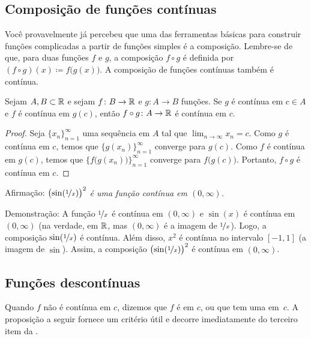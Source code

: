 \subsection{Composição de funções contínuas}

Você provavelmente já percebeu que uma das ferramentas básicas para
construir funções complicadas a partir de funções simples é a composição.
Lembre-se de que, para duas funções $f$ e $g$,
a composição $f \circ g$ é definida por
$(f \circ g)(x) \coloneqq f\bigl(g(x)\bigr)$.
A composição de
funções contínuas também é
contínua.

\begin{prop} \label{prop:compositioncont}
Sejam $A, B \subset {\mathbb{R}}$ e sejam $f \colon B \to {\mathbb{R}}$ e $g \colon A \to B$
funções. Se $g$ é contínua em $c \in A$ e
$f$ é contínua em $g(c)$, então $f \circ g \colon A \to {\mathbb{R}}$ é contínua
em $c$.
\end{prop}

\begin{proof}
Seja $\{ x_n \}_{n=1}^\infty$ uma sequência em $A$ tal que
$\lim_{n\to\infty} x_n = c$.
Como $g$ é contínua em $c$, temos que $\bigl\{ g(x_n) \bigr\}_{n=1}^\infty$ converge para $g(c)$.
Como $f$ é contínua em $g(c)$, temos que $\bigl\{ f\bigl(g(x_n)\bigr)
\bigr\}_{n=1}^\infty$ converge
para $f\bigl(g(c)\bigr)$.
Portanto, $f \circ g$ é contínua em $c$.
\end{proof}

\begin{example}
Afirmação: \emph{${\bigl(\sin(\nicefrac{1}{x})\bigr)}^2$ é uma função contínua em $(0,\infty)$.}

Demonstração: A função $\nicefrac{1}{x}$ é contínua em
$(0,\infty)$ e $\sin(x)$ é contínua em $(0,\infty)$ (na verdade,
em ${\mathbb{R}}$, mas $(0,\infty)$ é a imagem de $\nicefrac{1}{x}$).
Logo, a composição $\sin(\nicefrac{1}{x})$ é contínua. Além disso,
$x^2$ é contínua no intervalo $[-1,1]$ (a imagem de $\sin$).
Assim, a composição
${\bigl(\sin(\nicefrac{1}{x})\bigr)}^2$ é contínua em $(0,\infty)$.
\end{example}

\subsection{Funções descontínuas}

Quando $f$ não é contínua em $c$, dizemos
que $f$ é \emph{} em $c$, ou que tem uma
\emph{} em~$c$.
A proposição a seguir fornece um critério útil e decorre imediatamente
do terceiro item da .

